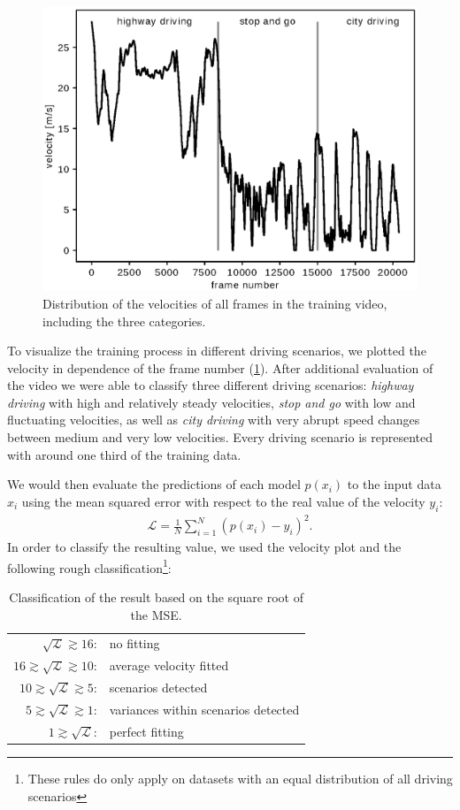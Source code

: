 \documentclass[conference]{IEEEtran}
\begin{document}
\begin{figure}[ht]
	\vspace{-0.6cm}
	\centering
	\includegraphics[width=0.8\columnwidth]{./imgs/plot_speed_time_new_splitting.eps}
	\caption{Distribution of the velocities of all frames in the training video, including the three categories.}
	\label{fig:SpeedPerFrameDistributionNewSplitting}
\end{figure}

To visualize the training process in different driving scenarios, we plotted the velocity in dependence of the frame number (\cref{fig:SpeedPerFrameDistributionNewSplitting}). After additional evaluation of the video we were able to classify three different driving scenarios: \emph{highway driving} with high and relatively steady velocities, \emph{stop and go} with low and fluctuating velocities, as well as \emph{city driving} with very abrupt speed changes between medium and very low velocities. Every driving scenario is represented with around one third of the training data.

We would then evaluate the predictions of each model $p(x_i)$ to the input data $x_i$ using the mean squared error with respect to the real value of the velocity $y_i$:
\begin{align*}
	\mathcal{L} = \frac{1}{N} \sum_{i=1}^{N} (p(x_i) - y_i)^2.
\end{align*}
In order to classify the resulting value, we used the velocity plot and the 
following rough classification\footnote{These rules do only apply on datasets with an equal distribution 
of all driving scenarios}:
\begin{table}[h!]
\normalsize
\centering
\begin{tabular}{r l}
$\sqrt{\mathcal{L}} \gtrsim 16$: & no fitting\\
$16 \gtrsim \sqrt{\mathcal{L}} \gtrsim 10$: & average velocity fitted\\
$10 \gtrsim \sqrt{\mathcal{L}} \gtrsim 5$: & scenarios detected\\
$5 \gtrsim \sqrt{\mathcal{L}} \gtrsim 1$: & variances within scenarios detected\\
$1 \gtrsim \sqrt{\mathcal{L}}$: & perfect fitting
\end{tabular}
\caption{Classification of the result based on the square root of the MSE.}
\end{table}
\end{document}

